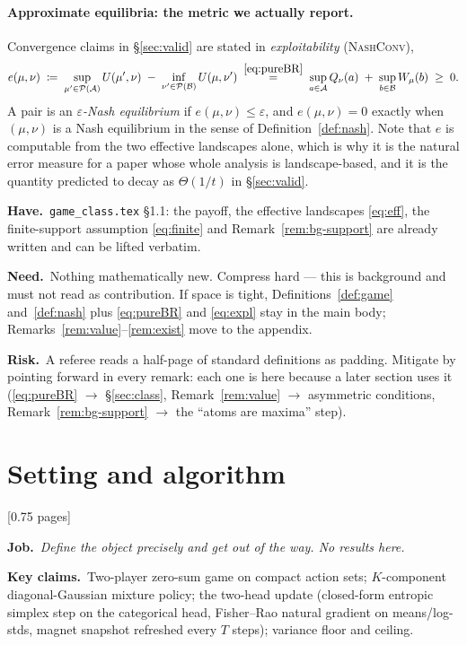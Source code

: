 \documentclass[11pt]{article}
\newcommand{\job}[1]{\par\smallskip\noindent
  \textcolor{jobc}{\textbf{Job.}}\ \emph{#1}\par\smallskip}
\newcommand{\says}[1]{\par\noindent\textbf{Key claims.}\ #1\par\smallskip}
\newcommand{\have}[1]{\par\noindent
  \textcolor{havec}{\textbf{Have.}}\ #1\par}
\newcommand{\need}[1]{\par\noindent
  \textcolor{needc}{\textbf{Need.}}\ #1\par}
\newcommand{\risk}[1]{\par\noindent
  \textcolor{riskc}{\textbf{Risk.}}\ #1\par\smallskip}
\newcommand{\budget}[1]{\hfill{\small\textsf{[#1]}}}
\theoremstyle{definition}
\theoremstyle{remark}
\newcommand{\cA}{\mathcal{A}}
\newcommand{\cB}{\mathcal{B}}
\newcommand{\cP}{\mathcal{P}}
\begin{document}
\paragraph{Approximate equilibria: the metric we actually report.}
Convergence claims in \S\ref{sec:valid} are stated in \emph{exploitability}
(\textsc{NashConv}),
\begin{equation}\label{eq:expl}
  e(\mu,\nu) \;\coloneqq\;
  \sup_{\mu' \in \cP(\cA)} U(\mu',\nu) \;-\; \inf_{\nu' \in \cP(\cB)} U(\mu,\nu')
  \;\overset{\eqref{eq:pureBR}}{=}\;
  \sup_{a \in \cA} Q_\nu(a) \;+\; \sup_{b \in \cB} W_\mu(b) \;\ge\; 0 .
\end{equation}
A pair is an \emph{$\varepsilon$-Nash equilibrium} if $e(\mu,\nu) \le
\varepsilon$, and $e(\mu,\nu) = 0$ exactly when $(\mu,\nu)$ is a Nash
equilibrium in the sense of Definition~\ref{def:nash}. Note that $e$ is
computable from the two effective landscapes alone, which is why it is the
natural error measure for a paper whose whole analysis is landscape-based, and it
is the quantity predicted to decay as $\Theta(1/t)$ in \S\ref{sec:valid}.

\have{\texttt{game\_class.tex} \S1.1: the payoff, the effective landscapes
\eqref{eq:eff}, the finite-support assumption \eqref{eq:finite} and
Remark~\ref{rem:bg-support} are already written and can be lifted verbatim.}

\need{Nothing mathematically new. Compress hard --- this is background and must
not read as contribution. If space is tight, Definitions~\ref{def:game}
and~\ref{def:nash} plus \eqref{eq:pureBR} and \eqref{eq:expl} stay in the main
body; Remarks~\ref{rem:value}--\ref{rem:exist} move to the appendix.}

\risk{A referee reads a half-page of standard definitions as padding. Mitigate by
pointing forward in every remark: each one is here because a later section uses
it (\eqref{eq:pureBR} $\to$ \S\ref{sec:class}, Remark~\ref{rem:value} $\to$
asymmetric conditions, Remark~\ref{rem:bg-support} $\to$ the ``atoms are maxima''
step).}

\section{Setting and algorithm}\label{sec:setup}
\budget{0.75 pages}

\job{Define the object precisely and get out of the way. No results here.}

\says{Two-player zero-sum game on compact action sets; $K$-component
diagonal-Gaussian mixture policy; the two-head update (closed-form entropic
simplex step on the categorical head, Fisher--Rao natural gradient on
means/log-stds, magnet snapshot refreshed every $T$ steps); variance floor and
ceiling.}
\end{document}
